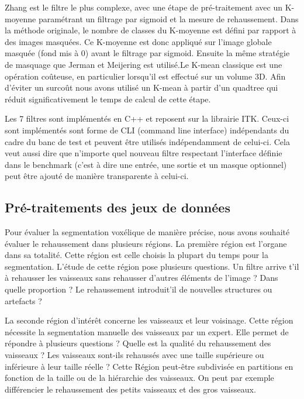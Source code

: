 Zhang est le filtre le plus complexe, avec une étape de pré-traitement avec un K-moyenne paramétrant un filtrage par sigmoid et la mesure de rehaussement. Dans la méthode originale, le nombre de classes du K-moyenne est défini par rapport à des images masquées. Ce K-moyenne est donc appliqué sur l'image globale masquée (fond mis à 0) avant le filtrage par sigmoid. Ensuite la même stratégie de masquage que Jerman et Meijering est utilisé.Le K-mean classique est une opération coûteuse, en particulier lorsqu'il est effectué sur un volume 3D. Afin d'éviter un surcoût nous avons utilisé un K-mean à partir d'un quadtree qui réduit significativement le temps de calcul de cette étape.



Les 7 filtres sont implémentés en C++ et reposent sur la librairie ITK. Ceux-ci sont implémentés sont forme de CLI (command line interface) indépendants du cadre du banc de test et peuvent être utilisés indépendamment de celui-ci. Cela veut aussi dire que n'importe quel nouveau filtre respectant l'interface définie dans le benchmark (c'est à dire une entrée, une sortie et un masque optionnel) peut être ajouté de manière transparente à celui-ci.

\subsection{Pré-traitements des jeux de données}
\label{sec:Benchmark:traitement_des_données}

Pour évaluer la segmentation voxélique de manière précise, nous avons souhaité évaluer le rehaussement dans plusieurs régions. La première région est l'organe dans sa totalité. Cette région est celle choisis la plupart du temps pour la segmentation. L'étude de cette région pose plusieurs questions. Un filtre arrive t'il à rehausser les vaisseaux sans rehausser d'autres éléments de l'image ? Dans quelle proportion ? Le rehaussement introduit'il de nouvelles structures ou artefacts ?

La seconde région d'intérêt concerne les vaisseaux et leur voisinage. Cette région nécessite la segmentation manuelle des vaisseaux par un expert. Elle permet de répondre à plusieurs questions ? Quelle est la qualité du rehaussement des vaisseaux ? Les vaisseaux sont-ils rehaussés avec une taille supérieure ou inférieure à leur taille réelle ? Cette Région peut-être subdivisée en partitions en fonction de la taille ou de la hiérarchie des vaisseaux. On peut par exemple différencier le rehaussement des petits vaisseaux et des gros vaisseaux.

